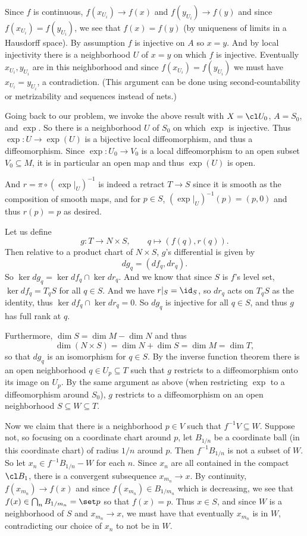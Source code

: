     Since $f$ is continuous, $f(x_{U_i})\to f(x)$ and $f(y_{U_i})\to f(y)$ and since $f(x_{U_i})=f(y_{U_i})$, we see that $f(x)=f(y)$ (by uniqueness of limits in a Hausdorff space).
    By assumption $f$ is injective on $A$ so $x=y$.
    And by local injectivity there is a neighborhood $U$ of $x=y$ on which $f$ is injective.
    Eventually $x_{U_i},y_{U_i}$ are in this neighborhood and since $f(x_{U_i})=f(y_{U_i})$ we must have $x_{U_i}=y_{U_i}$, a contradiction.
    (This argument can be done using second-countability or metrizability and sequences instead of nets.)

    Going back to our problem, we invoke the above result with $X=\cl U_0$, $A=S_0$, and $\exp$.
    So there is a neighborhood $U$ of $S_0$ on which $\exp$ is injective.
    Thus $\exp\colon U\to\exp(U)$ is a bijective local diffeomorphism, and thus a diffeomorphism.
    Since $\exp\colon U_0\to V_0$ is a local diffeomorphism to an open subset $V_0\subseteq M$, it is in particular an open map and thus $\exp(U)$ is open.

    And $r=\pi\circ(\exp|_U)^{-1}$ is indeed a retract $T\to S$ since it is smooth as the composition of smooth maps, and for $p\in S$, $(\exp|_U)^{-1}(p)=(p,0)$ and
    thus $r(p)=p$ as desired.

    \item Let us define
    $$ g\colon T \to N \times S,\qquad q\mapsto (f(q),r(q)) . $$
    Then relative to a product chart of $N\times S$, $g$'s differential is given by
    $$ dg_q = (df_q,dr_q) . $$
    So $\ker dg_q=\ker df_q\cap\ker dr_q$.
    And we know that since $S$ is $f$'s level set, $\ker df_q=T_qS$ for all $q\in S$.
    And we have $r|_S=\id_S$, so $dr_q$ acts on $T_qS$ as the identity, thus $\ker df_q\cap\ker dr_q=0$.
    So $dg_q$ is injective for all $q\in S$, and thus $g$ has full rank at $q$.

    Furthermore, $\dim S=\dim M-\dim N$ and thus
    $$ \dim(N\times S) = \dim N+\dim S = \dim M = \dim T , $$
    so that $dg_q$ is an isomorphism for $q\in S$.
    By the inverse function theorem there is an open neighborhood $q\in U_p\subseteq T$ such that $g$ restricts to a diffeomorphism onto its image on $U_p$.
    By the same argument as above (when restricting $\exp$ to a diffeomorphism around $S_0$), $g$ restricts to a diffeomorphism on an open neighborhood $S\subseteq W\subseteq T$.

    Now we claim that there is a neighborhood $p\in V$ such that $f^{-1}V\subseteq W$.
    Suppose not, so focusing on a coordinate chart around $p$, let $B_{1/n}$ be a coordinate ball (in this coordinate chart) of radius $1/n$ around $p$.
    Then $f^{-1}B_{1/n}$ is not a subset of $W$.
    So let $x_n\in f^{-1}B_{1/n}-W$ for each $n$.
    Since $x_n$ are all contained in the compact $\cl B_1$, there is a convergent subsequence $x_{m_n}\to x$.
    By continuity, $f(x_{m_n})\to f(x)$ and since $f(x_{m_n})\in B_{1/m_n}$ which is decreasing, we see that $f(x)\in\bigcap_n B_{1/m_n}=\set p$ so that $f(x)=p$.
    Thus $x\in S$, and since $W$ is a neighborhood of $S$ and $x_{m_n}\to x$, we must have that eventually $x_{m_n}$ is in $W$, contradicting our choice of $x_n$ to not be in $W$.

